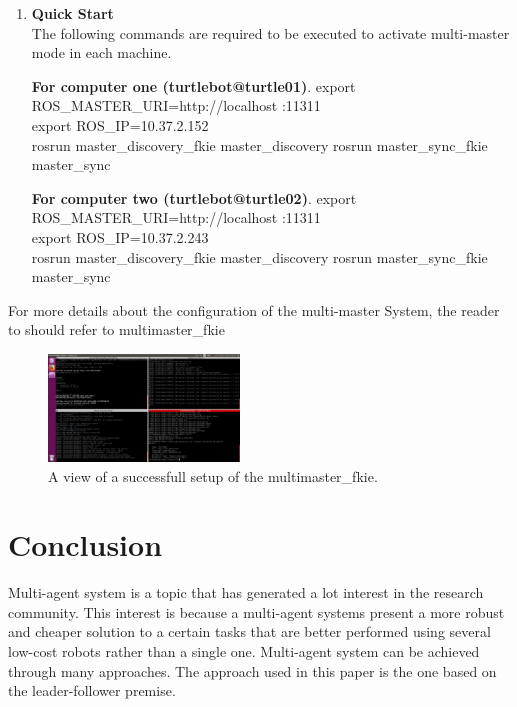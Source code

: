 \documentclass[journal]{IEEEtran}
\begin{document}
\begin{enumerate}
\begin{enumerate}
\begin{enumerate}
\item \textbf {Quick Start}\\
The following commands are required to be executed to activate multi-master mode in each machine.

\textbf{For computer one (turtlebot@turtle01)}.
export ROS{\_}MASTER{\_}URI=http://localhost :11311\\
export ROS{\_}IP=10.37.2.152\\
rosrun master{\_}discovery{\_}fkie master{\_}discovery
rosrun master{\_}sync{\_}fkie master{\_}sync



\textbf{For computer two (turtlebot@turtle02)}.
export ROS{\_}MASTER{\_}URI=http://localhost :11311\\
export ROS{\_}IP=10.37.2.243\\
rosrun master{\_}discovery{\_}fkie master{\_}discovery
rosrun master{\_}sync{\_}fkie master{\_}sync
\end{enumerate}
For more details about the configuration of the multi-master System, the reader to should refer to multimaster{\_}fkie\cite{temp11}

\begin{figure}[!h]
\begin{center}
\includegraphics[width=2in]{5.png}
\caption{A view of a successfull setup of the multimaster{\_}fkie.}
\end{center}
\label{fig:mypicture4}
\end{figure}


\end{enumerate}











\end{enumerate}
\section{Conclusion}


Multi-agent system is a topic that has generated a lot interest in the research community. This interest is because a multi-agent systems present a more robust and cheaper solution to a certain tasks that are better performed using several low-cost robots rather than a single one. Multi-agent system can be achieved through many approaches. The approach used in this paper is the one based on the leader-follower premise.
\end{document}
